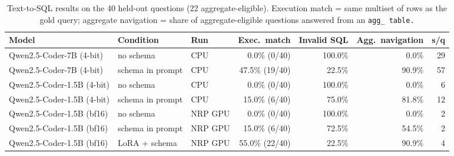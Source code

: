 \begin{table}[H]\centering\small
\caption{Text-to-SQL results on the 40 held-out questions (22 aggregate-eligible). Execution match = same multiset of rows as the gold query; aggregate navigation = share of aggregate-eligible questions answered from an \tt{agg\_} table.}\label{tab:llm}
\begin{tabular}{@{}lllrrrr@{}}
\toprule
\textbf{Model} & \textbf{Condition} & \textbf{Run} & \textbf{Exec.\ match} & \textbf{Invalid SQL} & \textbf{Agg.\ navigation} & \textbf{s/q} \\ \midrule
Qwen2.5-Coder-7B (4-bit) & no schema & CPU & 0.0\% (0/40) & 100.0\% & 0.0\% & 29 \\
Qwen2.5-Coder-7B (4-bit) & schema in prompt & CPU & 47.5\% (19/40) & 22.5\% & 90.9\% & 57 \\
\addlinespace[2pt]
Qwen2.5-Coder-1.5B (4-bit) & no schema & CPU & 0.0\% (0/40) & 100.0\% & 0.0\% & 6 \\
Qwen2.5-Coder-1.5B (4-bit) & schema in prompt & CPU & 15.0\% (6/40) & 75.0\% & 81.8\% & 12 \\
\addlinespace[2pt]
Qwen2.5-Coder-1.5B (bf16) & no schema & NRP GPU & 0.0\% (0/40) & 100.0\% & 0.0\% & 2 \\
Qwen2.5-Coder-1.5B (bf16) & schema in prompt & NRP GPU & 15.0\% (6/40) & 72.5\% & 54.5\% & 2 \\
Qwen2.5-Coder-1.5B (bf16) & LoRA + schema & NRP GPU & 55.0\% (22/40) & 22.5\% & 90.9\% & 4 \\
\bottomrule
\end{tabular}
\end{table}
